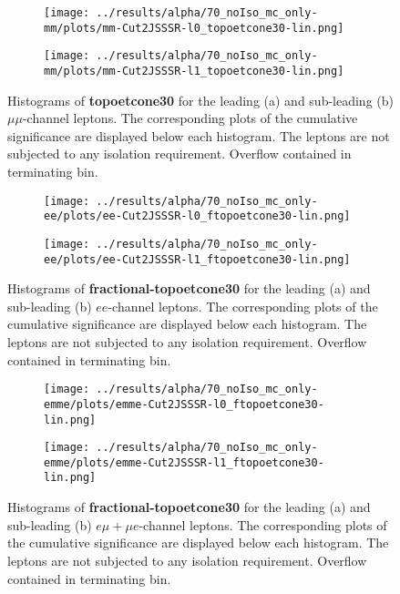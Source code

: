 \begin{figure}
\centering
\begin{subfigure}{.65\textwidth}
  \centering
  \texttt{[image: ../results/alpha/70\_noIso\_mc\_only-mm/plots/mm-Cut2JSSSR-l0\_topoetcone30-lin.png]}
  \caption{}
  \label{mm_leading_topoetcone}
\end{subfigure}
\begin{subfigure}{.65\textwidth}
 \centering
  \texttt{[image: ../results/alpha/70\_noIso\_mc\_only-mm/plots/mm-Cut2JSSSR-l1\_topoetcone30-lin.png]}
  \caption{}
  \label{mm_subleading_topoetcone}
\end{subfigure}
\caption{Histograms of \textbf{topoetcone30} for the leading (a) and sub-leading (b) $\mu\mu$-channel leptons. The corresponding plots of the cumulative significance are displayed below each histogram. The leptons are not subjected to any isolation requirement. Overflow contained in terminating bin.}
\label{topoetcone30_isoplots_noIso_mm}
\end{figure}
\begin{figure}
\centering
\begin{subfigure}{.65\textwidth}
  \centering
  \texttt{[image: ../results/alpha/70\_noIso\_mc\_only-ee/plots/ee-Cut2JSSSR-l0\_ftopoetcone30-lin.png]}
  \caption{}
  \label{ee_leading_topoetcone}
\end{subfigure}
\begin{subfigure}{.65\textwidth}
 \centering
  \texttt{[image: ../results/alpha/70\_noIso\_mc\_only-ee/plots/ee-Cut2JSSSR-l1\_ftopoetcone30-lin.png]}
  \caption{}
  \label{ee_subleading_topoetcone}
\end{subfigure}
\caption{Histograms of \textbf{fractional-topoetcone30} for the leading (a) and sub-leading (b) $ee$-channel leptons. The corresponding plots of the cumulative significance are displayed below each histogram. The leptons are not subjected to any isolation requirement. Overflow contained in terminating bin.}
\label{ftopoetcone30_isoplots_noIso_ee}
\end{figure}
\begin{figure}
\centering
\begin{subfigure}{.65\textwidth}
  \centering
  \texttt{[image: ../results/alpha/70\_noIso\_mc\_only-emme/plots/emme-Cut2JSSSR-l0\_ftopoetcone30-lin.png]}
  \caption{}
  \label{emme_leading_topoetcone}
\end{subfigure}
\begin{subfigure}{.65\textwidth}
 \centering
  \texttt{[image: ../results/alpha/70\_noIso\_mc\_only-emme/plots/emme-Cut2JSSSR-l1\_ftopoetcone30-lin.png]}
  \caption{}
  \label{emme_subleading_topoetcone}
\end{subfigure}
\caption{Histograms of \textbf{fractional-topoetcone30} for the leading (a) and sub-leading (b) $e\mu+\mu e$-channel leptons. The corresponding plots of the cumulative significance are displayed below each histogram. The leptons are not subjected to any isolation requirement. Overflow contained in terminating bin.}
\label{ftopoetcone30_isoplots_noIso_emme}
\end{figure}
